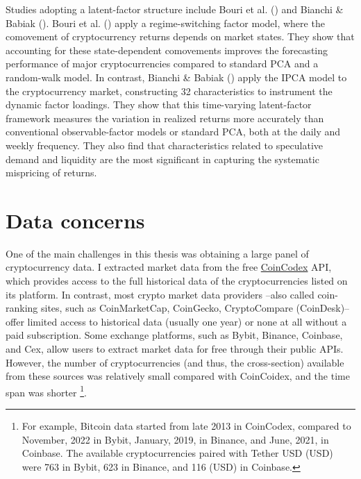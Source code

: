 \documentclass[
  12pt,
  a4paper,
  openany]{scrbook}
\begin{document}
Studies adopting a latent-factor structure include Bouri et al.
() and Bianchi \& Babiak
(). Bouri et
al. () apply a
regime-switching factor model, where the comovement of cryptocurrency
returns depends on market states. They show that accounting for these
state-dependent comovements improves the forecasting performance of
major cryptocurrencies compared to standard PCA and a random-walk model.
In contrast, Bianchi \& Babiak
() apply the
IPCA model to the cryptocurrency market, constructing 32 characteristics
to instrument the dynamic factor loadings. They show that this
time-varying latent-factor framework measures the variation in realized
returns more accurately than conventional observable-factor models or
standard PCA, both at the daily and weekly frequency. They also find
that characteristics related to speculative demand and liquidity are the
most significant in capturing the systematic mispricing of returns.

\section{Data concerns}\label{data-concerns}

One of the main challenges in this thesis was obtaining a large panel of
cryptocurrency data. I extracted market data from the free
\href{https://coincodex.com/}{CoinCodex} API, which provides access to
the full historical data of the cryptocurrencies listed on its platform.
In contrast, most crypto market data providers --also called
coin-ranking sites, such as CoinMarketCap, CoinGecko, CryptoCompare
(CoinDesk)-- offer limited access to historical data (usually one year)
or none at all without a paid subscription. Some exchange platforms,
such as Bybit, Binance, Coinbase, and Cex, allow users to extract market
data for free through their public APIs. However, the number of
cryptocurrencies (and thus, the cross-section) available from these
sources was relatively small compared with CoinCoidex, and the time span
was shorter \footnote{For example, Bitcoin data started from late 2013
  in CoinCodex, compared to November, 2022 in Bybit, January, 2019, in
  Binance, and June, 2021, in Coinbase. The available cryptocurrencies
  paired with Tether USD (USD) were 763 in Bybit, 623 in Binance, and
  116 (USD) in Coinbase.}.
\end{document}
